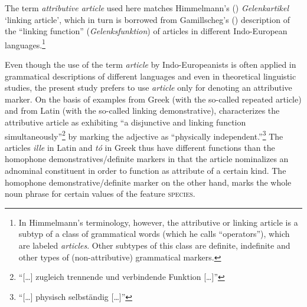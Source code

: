 The term \emph{attributive article} used here matches Himmelmann's (\citeyear{himmelmann1997}) \emph{Gelenkartikel} ‘linking article’, which in turn is borrowed from Gamillscheg's (\citeyear{gamillscheg1937}) description of the “linking function” (\emph{Gelenksfunktion}) of articles in different Indo-European languages.\footnote{In Himmelmann's \citeyear{himmelmann1997} terminology, however, the attributive or linking article is a subtyp of a class of grammatical words (which he calls “operators”), which are labeled \emph{articles}. Other subtypes of this class are definite, indefinite and other types of (non-attributive) grammatical markers.} 

Even though the use of the term \emph{article} by Indo-Europeanists is often applied in grammatical descriptions of different languages and even in theoretical linguistic studies, the present study prefers to use \emph{article} only for denoting an attributive marker. On the basis of examples from Greek (with the so-called repeated article) and from Latin (with the so-called linking demonstrative), \citet[48]{gamillscheg1937} characterizes the attributive article as exhibiting “a disjunctive and linking function simultaneously”\footnote{“[\dots] zugleich trennende und verbindende Funktion [\dots]”} by marking the adjective as “physically independent.”\footnote{“[\dots] physisch selbständig [\dots]”} The articles \textit{ille} in Latin and \textit{tó} in Greek thus have different functions than the homophone demonstratives\fshyp{}definite markers in that the article nominalizes an adnominal constituent in order to function as attribute of a certain kind. The homophone demonstrative\fshyp{}definite marker on the other hand, marks the whole noun phrase for certain values of the feature \textsc{species}.

